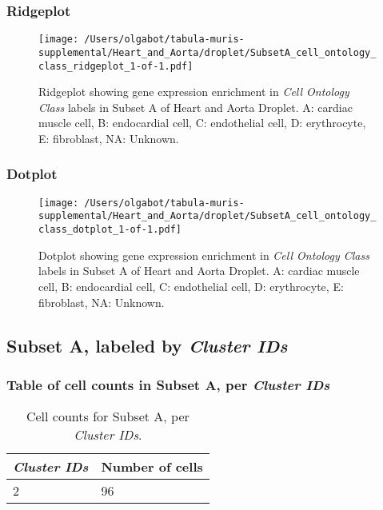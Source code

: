 \clearpage

\subsubsection{Ridgeplot}
\begin{figure}[h]
\centering
\texttt{[image: /Users/olgabot/tabula-muris-supplemental/Heart\_and\_Aorta/droplet/SubsetA\_cell\_ontology\_class\_ridgeplot\_1-of-1.pdf]}

\caption{ Ridgeplot  showing gene expression enrichment in \emph{Cell Ontology Class} labels in Subset A of Heart and Aorta Droplet. A: cardiac muscle cell, B: endocardial cell, C: endothelial cell, D: erythrocyte, E: fibroblast, NA: Unknown.}
\end{figure}


\clearpage

\subsubsection{Dotplot}
\begin{figure}[h]
\centering
\texttt{[image: /Users/olgabot/tabula-muris-supplemental/Heart\_and\_Aorta/droplet/SubsetA\_cell\_ontology\_class\_dotplot\_1-of-1.pdf]}

\caption{ Dotplot  showing gene expression enrichment in \emph{Cell Ontology Class} labels in Subset A of Heart and Aorta Droplet. A: cardiac muscle cell, B: endocardial cell, C: endothelial cell, D: erythrocyte, E: fibroblast, NA: Unknown.}
\end{figure}


\clearpage

\subsection{Subset A, labeled by \emph{Cluster IDs}}
\subsubsection{Table of cell counts in Subset A, per \emph{Cluster IDs}}\begin{table}[h]
\centering
\label{my-label}
\begin{tabular}{@{}ll@{}}
\toprule

\emph{Cluster IDs}& Number of cells \\ \midrule
2 & 96 \\
\bottomrule
\end{tabular}
\caption{Cell counts for Subset A, per \emph{Cluster IDs}.}
\end{table}


